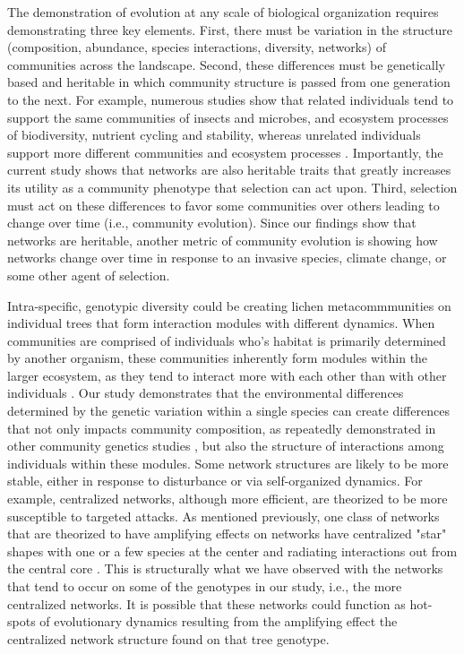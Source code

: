\documentclass[fleqn,12pt]{olplainarticle}
\begin{document}
The demonstration of evolution at any scale of biological organization
requires demonstrating three key elements. First, there must be
variation in the structure (composition, abundance, species
interactions, diversity, networks) of communities across the
landscape. Second, these differences must be genetically based and
heritable in which community structure is passed from one generation
to the next. For example, numerous studies show that related
individuals tend to support the same communities of insects and
microbes, and ecosystem processes of biodiversity, nutrient cycling
and stability, whereas unrelated individuals support more different
communities and ecosystem processes \citep{DesRoches2018TheVariation,
  Whitham2020IntraspecificEvolution}. Importantly, the current study
shows that networks are also heritable traits that greatly increases
its utility as a community phenotype that selection can act
upon. Third, selection must act on these differences to favor some
communities over others leading to change over time (i.e., community
evolution). Since our findings show that networks are heritable,
another metric of community evolution is showing how networks change
over time in response to an invasive species, climate change, or some
other agent of selection. 

Intra-specific, genotypic diversity could be creating lichen
metacommmunities on individual trees that form interaction modules
with different dynamics. When communities are comprised of individuals
who's habitat is primarily determined by another organism, these
communities inherently form modules within the larger ecosystem, as
they tend to interact more with each other than with other individuals
\citep{Lau2017a}. Our study demonstrates that the environmental
differences determined by the genetic variation within a single
species can create differences that not only impacts community
composition, as repeatedly demonstrated in other community genetics
studies \citep{Whitham2006a, DesRoches2018TheVariation}, but also the
structure of interactions among individuals within these modules.
Some network structures are likely to be more stable, either in
response to disturbance or via self-organized dynamics. For example,
centralized networks, although more efficient, are theorized to be
more susceptible to targeted attacks. As mentioned previously, one
class of networks that are theorized to have amplifying effects on
networks have centralized "star" shapes with one or a few species at
the center and radiating interactions out from the central core
\citep{Lleberman2005EvolutionaryGraphs}. This is structurally what we
have observed with the networks that tend to occur on some of the
genotypes in our study, i.e., the more centralized networks. It is
possible that these networks could function as hot-spots of
evolutionary dynamics resulting from the amplifying effect the
centralized network structure found on that tree genotype.
\end{document}

